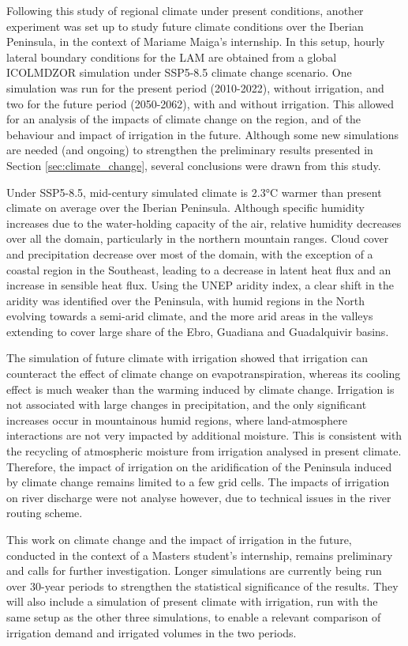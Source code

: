 \hfill

Following this study of regional climate under present conditions, another experiment was set up to study future climate conditions over the Iberian Peninsula, in the context of Mariame Maiga's internship.
In this setup, hourly lateral boundary conditions for the LAM are obtained from a global ICOLMDZOR simulation under SSP5-8.5 climate change scenario. 
One simulation was run for the present period (2010-2022), without irrigation, and two for the future period (2050-2062), with and without irrigation. This allowed for an analysis of the impacts of climate change on the region, and of the behaviour and impact of irrigation in the future. 
Although some new simulations are needed (and ongoing) to strengthen the preliminary results presented in Section \ref{sec:climate_change}, several conclusions were drawn from this study. 

Under SSP5-8.5, mid-century simulated climate is 2.3°C warmer than present climate on average over the Iberian Peninsula. Although specific humidity increases due to the water-holding capacity of the air, relative humidity decreases over all the domain, particularly in the northern mountain ranges. Cloud cover and precipitation decrease over most of the domain, with the exception of a coastal region in the Southeast, leading to a decrease in latent heat flux and an increase in sensible heat flux. Using the UNEP aridity index, a clear shift in the aridity was identified over the Peninsula, with humid regions in the North evolving towards a semi-arid climate, and the more arid areas in the valleys extending to cover large share of the Ebro, Guadiana and Guadalquivir basins.

The simulation of future climate with irrigation showed that irrigation can counteract the effect of climate change on evapotranspiration, whereas its cooling effect is much weaker than the warming induced by climate change. Irrigation is not associated with large changes in precipitation, and the only significant increases occur in mountainous humid regions, where land-atmosphere interactions are not very impacted by additional moisture. This is consistent with the recycling of atmospheric moisture from irrigation analysed in present climate.
Therefore, the impact of irrigation on the aridification of the Peninsula induced by climate change remains limited to a few grid cells.
The impacts of irrigation on river discharge were not analyse however, due to technical issues in the river routing scheme.

This work on climate change and the impact of irrigation in the future, conducted in the context of a Masters student's internship, remains preliminary and calls for further investigation. Longer simulations are currently being run over 30-year periods to strengthen the statistical significance of the results. They will also include a simulation of present climate with irrigation, run with the same setup as the other three simulations, to enable a relevant comparison of irrigation demand and irrigated volumes in the two periods.

\clearpage
